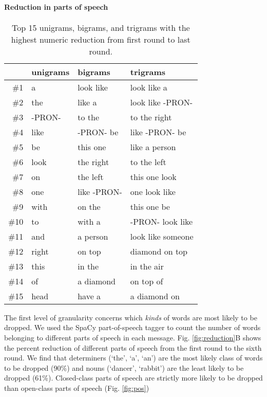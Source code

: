 \paragraph{Reduction in parts of speech}
\begin{table*}[t]
\centering
\begin{tabular}{|r||l|l|l|}
  \hline
 & unigrams & bigrams & trigrams \\ 
  \hline
\#1 & a & look like & look like a \\ 
  \#2 & the & like a & look like -PRON- \\ 
  \#3 & -PRON- & to the & to the right \\ 
  \#4 & like & -PRON- be & like -PRON- be \\ 
  \#5 & be & this one & like a person \\ 
  \#6 & look & the right & to the left \\ 
  \#7 & on & the left & this one look \\ 
  \#8 & one & like -PRON- & one look like \\ 
  \#9 & with & on the & this one be \\ 
  \#10 & to & with a & -PRON- look like \\ 
  \#11 & and & a person & look like someone \\ 
  \#12 & right & on top & diamond on top \\ 
  \#13 & this & in the & in the air \\ 
  \#14 & of & a diamond & on top of \\ 
  \#15 & head & have a & a diamond on \\ 
   \hline
\end{tabular}
\caption{Top 15 unigrams, bigrams, and trigrams with the highest numeric reduction from first round to last round.} 
\label{tab:words}
\end{table*}

The first level of granularity concerns which \emph{kinds} of words are most likely to be dropped. 
We used the SpaCy part-of-speech tagger \cite{spacy2} to count the number of words belonging to different parts of speech in each message.
Fig. \ref{fig:reduction}B shows the percent reduction of different parts of speech from the first round to the sixth round. 
We find that determiners (`the', `a', `an') are the most likely class of words to be dropped (90\%) and nouns (`dancer', `rabbit') are the least likely to be dropped (61\%).%
Closed-class parts of speech are strictly more likely to be dropped than open-class parts of speech (Fig. \ref{fig:pos}) 

